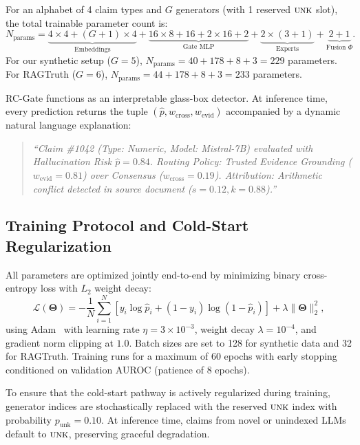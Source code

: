 \documentclass[pdflatex,sn-mathphys,Numbered]{sn-jnl}
\begin{document}
For an alphabet of 4 claim types and $G$ generators (with 1 reserved $\textsc{unk}$ slot), the total trainable parameter count is:
\begin{equation}
N_{\mathrm{params}} = \underbrace{4 \times 4 + (G + 1) \times 4}_{\text{Embeddings}} + \underbrace{16 \times 8 + 16 + 2 \times 16 + 2}_{\text{Gate MLP}} + \underbrace{2 \times (3 + 1)}_{\text{Experts}} + \underbrace{2 + 1}_{\text{Fusion } \Phi}.
\end{equation}
For our synthetic setup ($G=5$), $N_{\mathrm{params}} = 40 + 178 + 8 + 3 = 229$ parameters. For RAGTruth ($G=6$), $N_{\mathrm{params}} = 44 + 178 + 8 + 3 = 233$ parameters.

RC-Gate functions as an interpretable glass-box detector. At inference time, every prediction returns the tuple $(\hat{p}, w_{\mathrm{cross}}, w_{\mathrm{evid}})$ accompanied by a dynamic natural language explanation:
\begin{quote}
\emph{``Claim \#1042 (Type: Numeric, Model: Mistral-7B) evaluated with Hallucination Risk $\hat{p} = 0.84$. Routing Policy: Trusted Evidence Grounding ($w_{\mathrm{evid}} = 0.81$) over Consensus ($w_{\mathrm{cross}} = 0.19$). Attribution: Arithmetic conflict detected in source document ($s=0.12, k=0.88$).''}
\end{quote}

\subsection{Training Protocol and Cold-Start Regularization}\label{subsec:training}

All parameters are optimized jointly end-to-end by minimizing binary cross-entropy loss with $L_2$ weight decay:
\begin{equation}
\mathcal{L}(\boldsymbol{\Theta}) = -\frac{1}{N}\sum_{i=1}^N \left[ y_i \log \hat{p}_i + (1 - y_i) \log(1 - \hat{p}_i) \right] + \lambda \|\boldsymbol{\Theta}\|_2^2,
\end{equation}
using Adam~\cite{kingma2015adam} with learning rate $\eta = 3 \times 10^{-3}$, weight decay $\lambda = 10^{-4}$, and gradient norm clipping at $1.0$. Batch sizes are set to 128 for synthetic data and 32 for RAGTruth. Training runs for a maximum of 60 epochs with early stopping conditioned on validation AUROC (patience of 8 epochs).

To ensure that the cold-start pathway is actively regularized during training, generator indices are stochastically replaced with the reserved $\textsc{unk}$ index with probability $p_{\mathrm{unk}} = 0.10$. At inference time, claims from novel or unindexed LLMs default to $\textsc{unk}$, preserving graceful degradation.
\end{document}
